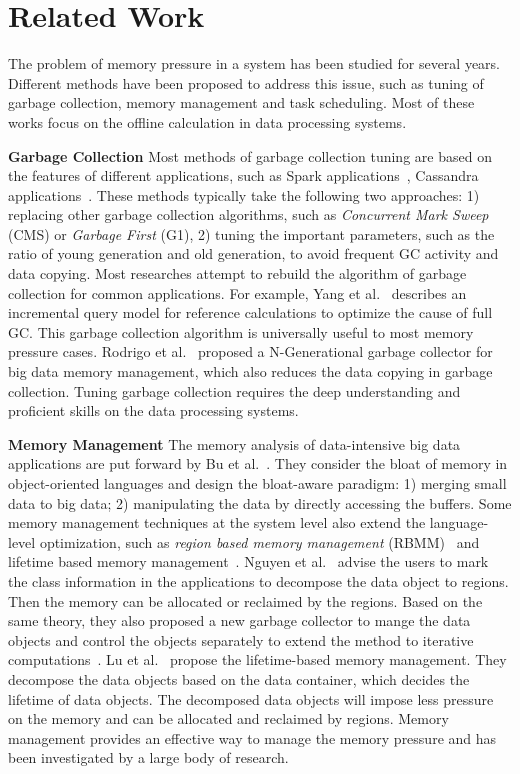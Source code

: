 \section{Related Work}

The problem of memory pressure in a system has been studied for several years. Different methods have been proposed to address this issue, such as tuning of garbage collection, memory management and task scheduling. Most of these works focus on the offline calculation in data processing systems. 

\textbf{Garbage Collection} Most methods of garbage collection tuning are based on the features of different applications, such as Spark applications~\cite{www:spark-tuning}, Cassandra applications~\cite{www:cassandra}. These methods typically take the following two approaches: 1) replacing other garbage collection algorithms, such as \textit{Concurrent Mark Sweep} (CMS) or \textit{Garbage First} (G1), 2) tuning the important parameters, such as the ratio of young generation and old generation, to avoid frequent GC activity and data copying. Most researches attempt to rebuild the algorithm of garbage collection for common applications. For example, Yang et al.~\cite{yang:fullgc} describes an incremental query model for reference calculations to optimize the cause of full GC. This garbage collection algorithm is universally useful to most memory pressure cases. Rodrigo et al.~\cite{rodigo:NGeneration} proposed a N-Generational garbage collector for big data memory management, which also reduces the data copying in garbage collection. Tuning garbage collection requires the deep understanding and proficient skills on the data processing systems. 

\textbf{Memory Management} The memory analysis of data-intensive big data applications are put forward by Bu et al.~\cite{bu:bloat}. They consider the bloat of memory in object-oriented languages and design the bloat-aware paradigm: 1) merging small data to big data; 2) manipulating the data by directly accessing the buffers. Some memory management techniques at the system level also extend the language-level optimization, such as \textit{region based memory management} (RBMM)~\cite{nguyen2015facade, nguyen:yak} and lifetime based memory management~\cite{lulu:deca}. Nguyen et al.~\cite{nguyen2015facade} advise the users to mark the class information in the applications to decompose the data object to regions. Then the memory can be allocated or reclaimed by the regions. Based on the same theory, they also proposed a new garbage collector to mange the data objects and control the objects separately to extend the method to iterative computations~\cite{nguyen:yak}. Lu et al.~\cite{lulu:deca} propose the lifetime-based memory management. They decompose the data objects based on the data container, which decides the lifetime of data objects. The decomposed data objects will impose less pressure on the memory and can be allocated and reclaimed by regions. Memory management provides an effective way to manage the memory pressure and has been investigated by a large body of research.


